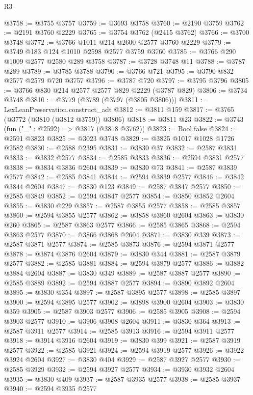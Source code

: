 \begin{lexlean}{R3}
\begin{coremodule}
@3758 := @3755 @3757
@3759 := @3693 @3758
@3760 := @2190 @3759
@3762 := @2191 @3760 @2229
@3765 := @3754 @3762 (@2415 @3762)
@3766 := @3700 @3748
@3772 := @3766 @1011 @214 @2600 @2577 @3760 @2229
@3779 := @3749 @183 @124 @1010 @2598 @2577 @3759 @3760
@3785 := @3766 @290 @1009 @2577 @2580 @289 @3758
@3787 := @3728 @3748 @11
@3788 := @3787 @289
@3789 := @3785 @3788
@3790 := @3766 @721
@3795 := @3790 @832 @2577 @2579 @720 @3757
@3796 := @3787 @720
@3797 := @3795 @3796
@3805 := @3766 @830 @214 @2577 @2577 @829 @2229 (@3787 @829)
@3806 := @3734 @3748
@3810 := @3779 (@3789 (@3797 (@3805 @3806)))
@3811 := LexLeanPreservation.construct_adt
@3812 := @3811 @159
@3817 := @3765 (@3772 (@3810 (@3812 @3759)) @3806)
@3818 := @3811 @23
@3822 := @3743 (fun ("_" : @2592) => @3817 (@3818 @3762))
@3823 := Bool.false
@3824 := @2591 @3823
@3825 := @3023 @3748
@3829 := @3825 @1017 @1028 @1726 @2582
@3830 := @2588 @2395
@3831 := @3830 @37
@3832 := @2587 @3831
@3833 := @3832 @2577
@3834 := @2585 @3833
@3836 := @2594 @3831 @2577
@3838 := @3834 @3836 @2604
@3839 := @3830 @73
@3841 := @2587 @3839 @2577
@3842 := @2585 @3841
@3844 := @2594 @3839 @2577
@3846 := @3842 @3844 @2604
@3847 := @3830 @123
@3849 := @2587 @3847 @2577
@3850 := @2585 @3849
@3852 := @2594 @3847 @2577
@3854 := @3850 @3852 @2604
@3855 := @3830 @229
@3857 := @2587 @3855 @2577
@3858 := @2585 @3857
@3860 := @2594 @3855 @2577
@3862 := @3858 @3860 @2604
@3863 := @3830 @260
@3865 := @2587 @3863 @2577
@3866 := @2585 @3865
@3868 := @2594 @3863 @2577
@3870 := @3866 @3868 @2604
@3871 := @3830 @339
@3873 := @2587 @3871 @2577
@3874 := @2585 @3873
@3876 := @2594 @3871 @2577
@3878 := @3874 @3876 @2604
@3879 := @3830 @344
@3881 := @2587 @3879 @2577
@3882 := @2585 @3881
@3884 := @2594 @3879 @2577
@3886 := @3882 @3884 @2604
@3887 := @3830 @349
@3889 := @2587 @3887 @2577
@3890 := @2585 @3889
@3892 := @2594 @3887 @2577
@3894 := @3890 @3892 @2604
@3895 := @3830 @354
@3897 := @2587 @3895 @2577
@3898 := @2585 @3897
@3900 := @2594 @3895 @2577
@3902 := @3898 @3900 @2604
@3903 := @3830 @359
@3905 := @2587 @3903 @2577
@3906 := @2585 @3905
@3908 := @2594 @3903 @2577
@3910 := @3906 @3908 @2604
@3911 := @3830 @364
@3913 := @2587 @3911 @2577
@3914 := @2585 @3913
@3916 := @2594 @3911 @2577
@3918 := @3914 @3916 @2604
@3919 := @3830 @399
@3921 := @2587 @3919 @2577
@3922 := @2585 @3921
@3924 := @2594 @3919 @2577
@3926 := @3922 @3924 @2604
@3927 := @3830 @404
@3929 := @2587 @3927 @2577
@3930 := @2585 @3929
@3932 := @2594 @3927 @2577
@3934 := @3930 @3932 @2604
@3935 := @3830 @409
@3937 := @2587 @3935 @2577
@3938 := @2585 @3937
@3940 := @2594 @3935 @2577

\end{coremodule}
\end{lexlean}
